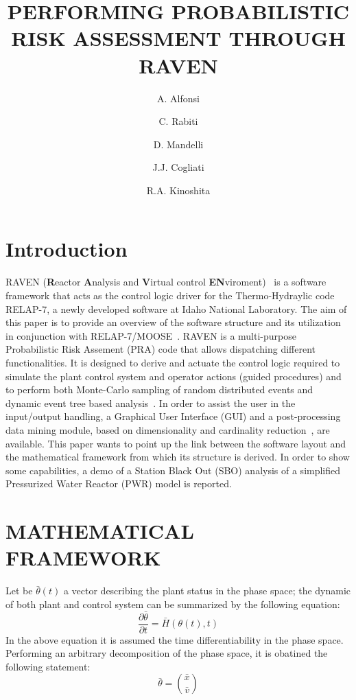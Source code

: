\documentclass{anstrans}
\title{PERFORMING PROBABILISTIC RISK ASSESSMENT THROUGH RAVEN}
\author{A. Alfonsi \and  C. Rabiti \and D. Mandelli \and J.J. Cogliati \and R.A. Kinoshita}
\institute{
Idaho National Laboratory
}
\begin{document}
  \twocolumn[
    \begin{@twocolumnfalse}
        \maketitle
    \end{@twocolumnfalse}
  ]

\section{Introduction}
RAVEN (\textbf{R}eactor \textbf{A}nalysis and \textbf{V}irtual control \textbf{EN}viroment)~\cite{ravenFY12,mandelliANS2012} is a software framework that acts as the control logic driver for the Thermo-Hydraylic code RELAP-7, a newly developed software at Idaho National Laboratory. The aim of this paper is to provide an overview of the software structure and its utilization in conjunction with RELAP-7/MOOSE~\cite{MOOSE,relap7FY12}. RAVEN is a multi-purpose Probabilistic Risk Assement (PRA) code that allows dispatching different functionalities. 
It is designed to derive and actuate the control logic required to simulate the plant control system and operator actions (guided procedures) and to perform both Monte-Carlo sampling of random distributed events and dynamic event tree based analysis~\cite{ADAPTHakobyan}. 
In order to assist the user in the input/output handling, a Graphical User Interface (GUI) and a post-processing data mining module, based on dimensionality and cardinality reduction~\cite{mandelliEsrel2011}, are available.
This paper wants to point up the link between the software layout and the mathematical framework from which its structure is derived. In order to show some capabilities, a demo of a Station Black Out (SBO) analysis of a simplified Pressurized Water Reactor (PWR) model is reported.
\section{MATHEMATICAL FRAMEWORK}
\label{sec:mathFramework}
Let be $\bar{\theta}(t)$ a vector describing the plant status in the phase space; the dynamic of both plant and control system can be summarized by the following equation:
\begin{equation}
\frac{\partial \bar{\theta}}{\partial t} = \bar{H}(\theta(t),t)
\label{eq:SystemDynamics}
\end{equation}
In the above equation it is assumed the time differentiability in the phase space. Performing an arbitrary decomposition of the phase space, it is obatined the following statement:
\begin{equation}
\bar{\theta}=\binom{\bar{x}}{\bar{v}}
\label{eq:firstDecomposition}
\end{equation}
\end{document}
